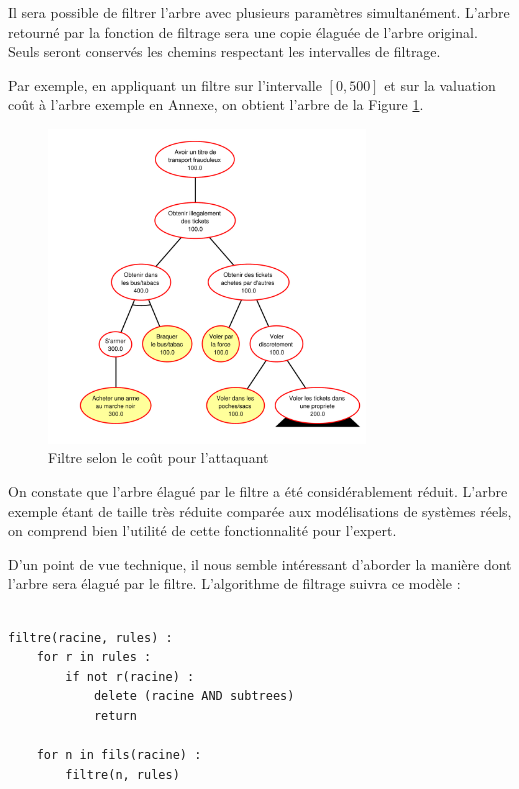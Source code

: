 		Il sera possible de filtrer l'arbre avec plusieurs paramètres simultanément.
		L'arbre retourné par la fonction de filtrage sera une copie élaguée de l'arbre original. Seuls seront conservés les chemins respectant les intervalles de filtrage.
		
		Par exemple, en appliquant un filtre sur l'intervalle $[0, 500]$ et sur la valuation \og coût \fg à l'arbre exemple en Annexe, on obtient l'arbre de la Figure \ref{fig:arbre_post_filtre}.

		\begin{figure}[h!]
			\begin{center}
				\includegraphics[width=0.75\textwidth]{figure/post_filtre.pdf}
			\end{center}
			\caption{Filtre selon le coût pour l'attaquant}
			\label{fig:arbre_post_filtre}
		\end{figure}

		On constate que l'arbre élagué par le filtre a été considérablement réduit. L'arbre exemple étant de taille très réduite comparée aux modélisations de systèmes réels, on comprend bien l'utilité de cette fonctionnalité pour l'expert.

		D'un point de vue technique, il nous semble intéressant d'aborder la manière dont l'arbre sera élagué par le filtre.
		L'algorithme de filtrage suivra ce modèle :

		\begin{lstlisting}

filtre(racine, rules) :
	for r in rules :
		if not r(racine) :
			delete (racine AND subtrees)
			return

	for n in fils(racine) :
		filtre(n, rules)

		\end{lstlisting}

